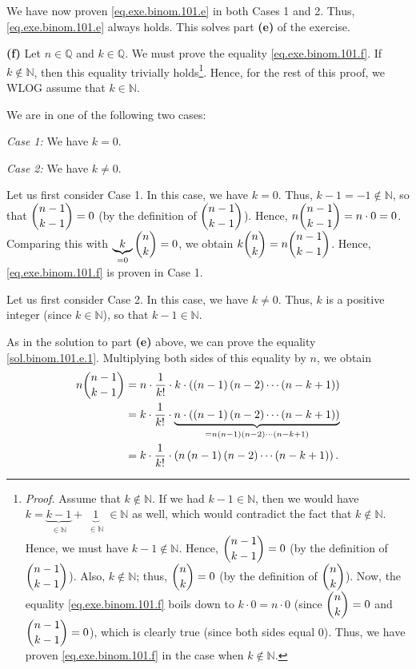\documentclass[paper=a4, fontsize=12pt]{scrartcl} %
\newcommand{\QQ}{\mathbb{Q}} %
\newcommand{\NN}{\mathbb{N}} %
\newcommand{\tup}[1]{\left( #1 \right)}
\newcommand{\underbrack}[2]{\underbrace{#1}_{\substack{#2}}}
\theoremstyle{plainsl}
\theoremstyle{definition}
\theoremstyle{remark}
\begin{document}
We have now proven \eqref{eq.exe.binom.101.e} in both
Cases 1 and 2. Thus, \eqref{eq.exe.binom.101.e} always holds.
This solves part \textbf{(e)} of the exercise.

\vspace{0.8pc}

\textbf{(f)}
Let $n \in \QQ$ and $k \in \QQ$.
We must prove the equality \eqref{eq.exe.binom.101.f}.
If $k \notin \NN$, then this equality trivially
holds\footnote{\textit{Proof.} Assume that $k \notin \NN$.
If we had $k-1 \in \NN$, then we would have
$k = \underbrack{k-1}{\in \NN} + \underbrack{1}{\in \NN} \in \NN$
as well, which would contradict the fact that $k \notin \NN$.
Hence, we must have $k-1 \notin \NN$.
Hence, $\dbinom{n-1}{k-1} = 0$ (by the definition of
$\dbinom{n-1}{k-1}$).
Also, $k \notin \NN$; thus,
$\dbinom{n}{k} = 0$ (by the definition of $\dbinom{n}{k}$).
Now, the equality \eqref{eq.exe.binom.101.f} boils down to
$k \cdot 0 = n \cdot 0$ (since $\dbinom{n}{k} = 0$ and
$\dbinom{n-1}{k-1} = 0$), which is
clearly true (since both sides equal $0$).
Thus, we have proven \eqref{eq.exe.binom.101.f} in the case
when $k \notin \NN$.}.
Hence, for the rest of this proof, we WLOG assume that $k \in \NN$.

We are in one of the following two cases:

\textit{Case 1:} We have $k = 0$.

\textit{Case 2:} We have $k \neq 0$.

Let us first consider Case 1.
In this case, we have $k = 0$.
Thus, $k-1 = -1 \notin \NN$, so that $\dbinom{n-1}{k-1} = 0$
(by the definition of $\dbinom{n-1}{k-1}$).
Hence, $n \dbinom{n-1}{k-1} = n \cdot 0 = 0$.
Comparing this with $\underbrack{k}{= 0} \dbinom{n}{k} = 0$,
we obtain $k \dbinom{n}{k} = n \dbinom{n-1}{k-1}$.
Hence, \eqref{eq.exe.binom.101.f} is proven in Case 1.

Let us first consider Case 2.
In this case, we have $k \neq 0$.
Thus, $k$ is a positive integer (since $k \in \NN$), so that
$k-1 \in \NN$.

As in the solution to part \textbf{(e)} above, we can prove
the equality \eqref{sol.binom.101.e.1}.
Multiplying both sides of this equality by $n$, we obtain
\begin{align}
n \dbinom{n-1}{k-1}
&= n \cdot \dfrac{1}{k!} \cdot k \cdot \tup{ \tup{n-1} \tup{n-2} \cdots \tup{n-k+1} } \nonumber\\
&= k \cdot \dfrac{1}{k!} \cdot
     \underbrack{n \cdot \tup{ \tup{n-1} \tup{n-2} \cdots \tup{n-k+1} }}
                {= n \tup{n-1} \tup{n-2} \cdots \tup{n-k+1}} \nonumber\\
&= k \cdot \dfrac{1}{k!} \cdot
     \tup{n \tup{n-1} \tup{n-2} \cdots \tup{n-k+1}} .
\label{sol.binom.101.f.1}
\end{align}
\end{document}
